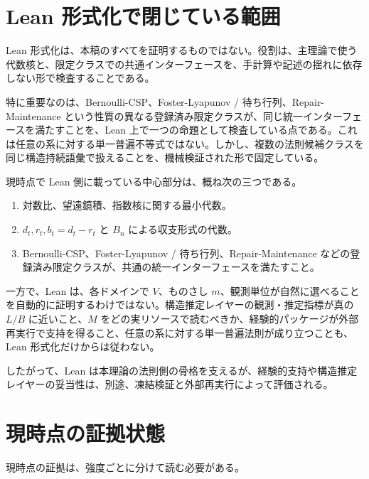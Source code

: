 \documentclass[12pt,a4paper]{article}
\begin{document}
\section{Lean 形式化で閉じている範囲}\label{lean-ux5f62ux5f0fux5316ux3067ux9589ux3058ux3066ux3044ux308bux7bc4ux56f2}

Lean 形式化は、本稿のすべてを証明するものではない。役割は、主理論で使う代数核と、限定クラスでの共通インターフェースを、手計算や記述の揺れに依存しない形で検査することである。

特に重要なのは、Bernoulli-CSP、Foster-Lyapunov / 待ち行列、Repair-Maintenance という性質の異なる登録済み限定クラスが、同じ統一インターフェースを満たすことを、Lean 上で一つの命題として検査している点である。これは任意の系に対する単一普遍不等式ではない。しかし、複数の法則候補クラスを同じ構造持続語彙で扱えることを、機械検証された形で固定している。

現時点で Lean 側に載っている中心部分は、概ね次の三つである。

\begin{enumerate}
\def\labelenumi{\arabic{enumi}.}
\tightlist
\item
  対数比、望遠鏡積、指数核に関する最小代数。
\item
  \(d_{t},r_{t},b_{t}=d_{t}-r_{t}\) と \(B_{n}\) による収支形式の代数。
\item
  Bernoulli-CSP、Foster-Lyapunov / 待ち行列、Repair-Maintenance などの登録済み限定クラスが、共通の統一インターフェースを満たすこと。
\end{enumerate}

一方で、Lean は、各ドメインで \(V\)、ものさし \(m\)、観測単位が自然に選べることを自動的に証明するわけではない。構造推定レイヤーの観測・推定指標が真の \(L/B\) に近いこと、\(M\) をどの実リソースで読むべきか、経験的パッケージが外部再実行で支持を得ること、任意の系に対する単一普遍法則が成り立つことも、Lean 形式化だけからは従わない。

したがって、Lean は本理論の法則側の骨格を支えるが、経験的支持や構造推定レイヤーの妥当性は、別途、凍結検証と外部再実行によって評価される。

\section{現時点の証拠状態}\label{ux73feux6642ux70b9ux306eux8a3cux62e0ux72b6ux614b}

現時点の証拠は、強度ごとに分けて読む必要がある。
\end{document}
